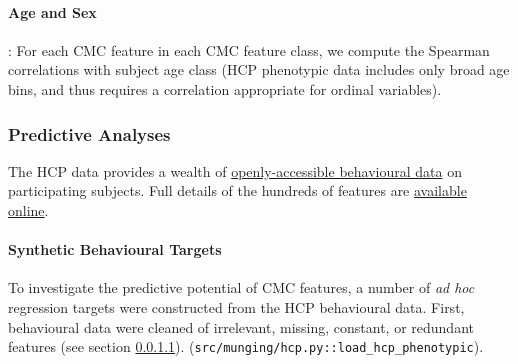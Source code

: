\documentclass{article}
\begin{document}
\paragraph{Age and Sex}: For each CMC feature in each CMC feature class, we
compute the Spearman correlations with subject age class (HCP phenotypic data
includes only broad age bins, and thus requires a correlation appropriate for
ordinal variables).



\subsubsection{Predictive Analyses}

The HCP data provides a wealth of
\href{https://www.humanconnectome.org/study/hcp-young-adult/document/wu-minn-hcp-consortium-open-access-data-use-terms}{openly-accessible
behavioural data} on participating subjects. Full details of the hundreds of
features are
\href{https://wiki.humanconnectome.org/docs/HCP-YA%20Data%20Dictionary-%20Updated%20for%20the%201200%20Subject%20Release.html}{available
online}.

\paragraph{Synthetic Behavioural Targets} \label{sec:cleaning}

To investigate the predictive potential of CMC features, a number of \emph{ad
hoc} regression targets were constructed from the HCP behavioural data.
First, behavioural data were cleaned of irrelevant, missing, constant, or
redundant features (see section \ref{sec:cleaning}).
(\texttt{src/munging/hcp.py::load\_hcp\_phenotypic}).
\end{document}
